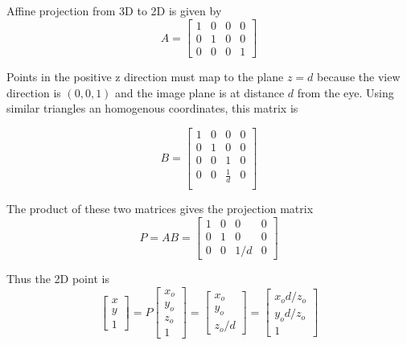 \documentclass[a4paper,10pt]{scrartcl}
\begin{document}
\subsection{}            

Affine projection from 3D to 2D is given by \[A = \begin{bmatrix} 1 & 0 & 0 & 0 \\ 0 & 1 & 0 & 0 \\ 0 & 0 & 0 & 1 \end{bmatrix}\]

Points in the positive z direction must map to the plane $z = d$ because the view direction is $(0, 0, 1)$ and the image plane is at distance $d$ from the eye.
Using similar triangles an homogenous coordinates, this matrix is

\[ B =\begin{bmatrix}1 & 0 & 0 & 0\\
    0 & 1 & 0 & 0 \\
    0 & 0 & 1 & 0 \\
    0 & 0 & \frac{1}{d} & 0 \\
\end{bmatrix}\]
            
The product of these two matrices gives the projection matrix \[ P = AB = \begin{bmatrix} 1 & 0 & 0 & 0 \\ 0 & 1 & 0 & 0 \\ 0 & 0 & 1/d & 0 \end{bmatrix}\] 

Thus the 2D point is \[ \begin{bmatrix} x \\ y \\ 1\end{bmatrix} = P \begin{bmatrix} x_o \\ y_o \\ z_o \\ 1\end{bmatrix} = \begin{bmatrix} x_o \\ y_o \\ z_o/d\end{bmatrix} = \begin{bmatrix}x_od/z_o \\ y_od/z_o \\ 1\end{bmatrix}\]


\subsection{}
\end{document}
